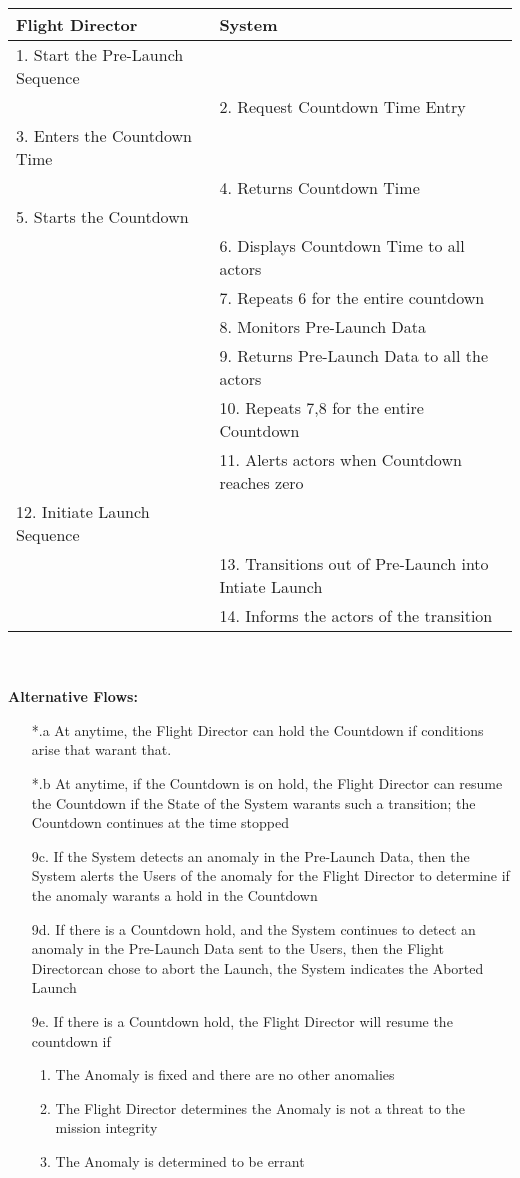 \documentclass[letterpaper]{article}
\begin{document}
\begin{tabular}{|p{5.75cm}|p{5.75cm}|}\hline
\textbf{Flight Director} & \textbf{System}\\\hline
1.  Start the Pre-Launch Sequence & \\\hline
& 2. Request Countdown Time Entry\\\hline
3.  Enters the Countdown Time & \\\hline
& 4.  Returns Countdown Time\\\hline
5.  Starts the Countdown  & \\\hline
& 6.  Displays Countdown Time to all actors\\\hline
& 7.  Repeats 6 for the entire countdown\\\hline
& 8.  Monitors Pre-Launch Data\\\hline
& 9. Returns Pre-Launch Data to all the actors\\\hline
& 10.  Repeats 7,8 for the entire Countdown\\\hline
& 11.  Alerts actors when Countdown reaches zero\\\hline
12.  Initiate Launch Sequence & \\\hline
& 13.  Transitions out of Pre-Launch into Intiate Launch\\\hline
& 14.  Informs the actors of the transition\\\hline
\end{tabular}\\\\
\textbf{Alternative Flows:  }
\begin{itemize}
\item[*.a]  At anytime, the Flight Director can hold the Countdown
if conditions arise that warant that.
\item[*.b] At anytime, if the Countdown is on hold, the Flight
Director can resume the Countdown if the State of the System warants
such a transition;  the Countdown continues at the time stopped
\item[9c.]  If the System detects an anomaly in the
Pre-Launch Data, then the System alerts the Users of the anomaly for
the Flight Director to determine if the anomaly warants a hold in the
Countdown
\item[9d.]  If there is a Countdown hold, and the System continues to
detect an anomaly in the Pre-Launch Data sent to the Users, then the
Flight Directorcan chose to abort the Launch, the System indicates the
Aborted Launch
\item[9e.]  If there is a Countdown hold, the Flight Director will
resume the countdown if
\begin{enumerate}
\item The Anomaly is fixed and there are no other anomalies
\item The Flight Director determines the Anomaly is not a threat
to the mission integrity
\item The Anomaly is determined to be errant
\end{enumerate}
\end{itemize}
\end{document}
